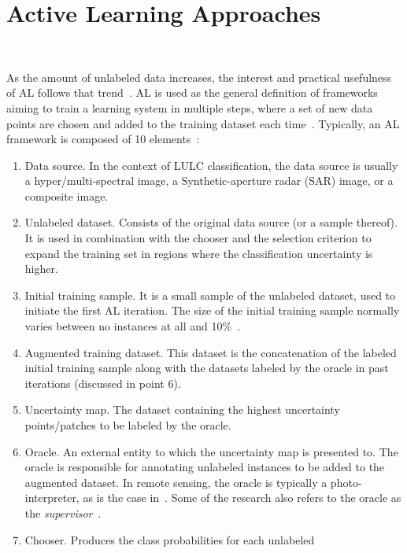 \documentclass[preprint,12pt]{elsarticle}
\begin{document}
\section{Active Learning Approaches}~\label{sec:al-sota}

As the amount of unlabeled data increases, the interest and practical
usefulness of AL follows that trend~\cite{Kottke2017}. AL is used as the
general definition of frameworks aiming to train a learning system in multiple
steps, where a set of new data points are chosen and added to the training
dataset each time~\cite{Ruzicka2020}. Typically, an AL framework is composed of
10 elements~\cite{Sverchkov2017,Su2020,Ruzicka2020}:

\begin{enumerate}
    \item Data source. In the context of LULC classification, the data source
        is usually a hyper/multi-spectral image, a Synthetic-aperture radar
        (SAR) image, or a composite image.
    \item Unlabeled dataset. Consists of the original data source (or a sample
        thereof). It is used in combination with the chooser and the
        selection criterion to expand the training set in regions where the
        classification uncertainty is higher.
    \item Initial training sample. It is a small sample of the unlabeled
        dataset, used to initiate the first AL iteration. The size of the
        initial training sample normally varies between no instances at all
        and 10\%~\cite{Li2013}.
    \item Augmented training dataset. This dataset is the concatenation of the
        labeled initial training sample along with the datasets labeled by the
        oracle in past iterations (discussed in point 6).
    \item Uncertainty map. The dataset containing the highest uncertainty
        points/patches to be labeled by the oracle.
    \item Oracle. An external entity to which the uncertainty map is presented
        to. The oracle is responsible for annotating unlabeled instances to be
        added to the augmented dataset. In remote sensing, the oracle is
        typically a photo-interpreter, as is the case in~\cite{li2020}. Some of
        the research also refers to the oracle as the
        \textit{supervisor}~\cite{Su2020, Shrivastava2021}.
    \item Chooser. Produces the class probabilities for each unlabeled

\end{enumerate}
\end{document}
